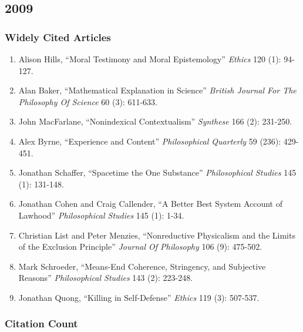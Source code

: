 \documentclass[
  10pt,
  letterpaper,
  DIV=11,
  numbers=noendperiod,
  twoside]{scrartcl}
\providecommand{\tightlist}{%
  \setlength{\itemsep}{0pt}\setlength{\parskip}{0pt}}\usepackage{longtable,booktabs,array}
\begin{document}
\newpage

\subsection{2009}\label{section-33}

\subsubsection*{Widely Cited Articles}\label{widely-cited-articles-33}

\begin{enumerate}
\def\labelenumi{\arabic{enumi}.}
\tightlist
\item
  Alison Hills, ``Moral Testimony and Moral Epistemology'' \emph{Ethics}
  120 (1): 94-127.
\item
  Alan Baker, ``Mathematical Explanation in Science'' \emph{British
  Journal For The Philosophy Of Science} 60 (3): 611-633.
\item
  John MacFarlane, ``Nonindexical Contextualism'' \emph{Synthese} 166
  (2): 231-250.
\item
  Alex Byrne, ``Experience and Content'' \emph{Philosophical Quarterly}
  59 (236): 429-451.
\item
  Jonathan Schaffer, ``Spacetime the One Substance'' \emph{Philosophical
  Studies} 145 (1): 131-148.
\item
  Jonathan Cohen and Craig Callender, ``A Better Best System Account of
  Lawhood'' \emph{Philosophical Studies} 145 (1): 1-34.
\item
  Christian List and Peter Menzies, ``Nonreductive Physicalism and the
  Limits of the Exclusion Principle'' \emph{Journal Of Philosophy} 106
  (9): 475-502.
\item
  Mark Schroeder, ``Means-End Coherence, Stringency, and Subjective
  Reasons'' \emph{Philosophical Studies} 143 (2): 223-248.
\item
  Jonathan Quong, ``Killing in Self-Defense'' \emph{Ethics} 119 (3):
  507-537.
\end{enumerate}

\subsubsection*{Citation Count}\label{citation-count-33}
\end{document}
